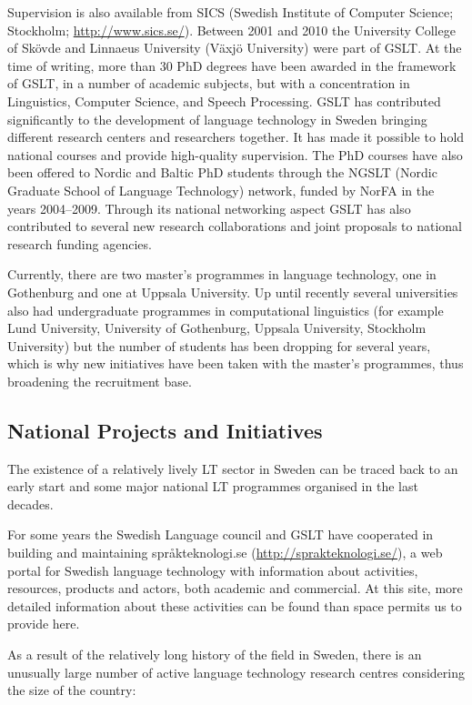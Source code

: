\begin{multicols}{2}
Supervision is also available from SICS (Swedish Institute of Computer
Science; Stockholm; \url{http://www.sics.se/}). Between 2001 and
2010 the University College of Skövde and Linnaeus University (Växjö
University) were part of GSLT. At the time of writing, more than 30
PhD degrees have been awarded in the framework of GSLT, in a number of
academic subjects, but with a concentration in Linguistics, Computer
Science, and Speech Processing. GSLT has contributed significantly to
the development of language technology in Sweden bringing different
research centers and researchers together. It has made it possible to
hold national courses and provide high-quality supervision. The PhD
courses have also been offered to Nordic and Baltic PhD students
through the NGSLT (Nordic Graduate School of Language Technology)
network, funded by NorFA in the years 2004–2009. Through its national
networking aspect GSLT has also contributed to several new research
collaborations and joint proposals to national research funding
agencies.

Currently, there are two master’s programmes in language technology,
one in Gothenburg and one at Uppsala University. Up until recently
several universities also had undergraduate programmes in
computational linguistics (for example Lund University, University of
Gothenburg, Uppsala University, Stockholm University) but the number
of students has been dropping for several years, which is why new
initiatives have been taken with the master's programmes, thus
broadening the recruitment base.

\subsection{National Projects and Initiatives}

The existence of a relatively lively LT sector in Sweden can be traced
back to an early start and some major national LT programmes organised
in the last decades.

For some years the Swedish Language council and GSLT have cooperated
in building and maintaining språkteknologi.se
(\url{http://sprakteknologi.se/}), a web portal for Swedish language
technology with information about activities, resources, products and
actors, both academic and commercial. At this site, more detailed
information about these activities can be found than space permits us
to provide here.

As a result of the relatively long history of the field in Sweden,
there is an unusually large number of active language technology
research centres considering the size of the country: 


\end{multicols}
